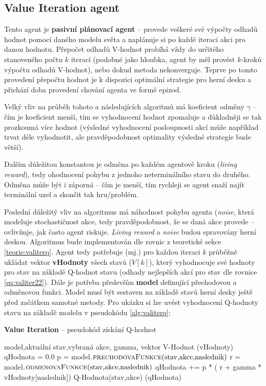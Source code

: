 \subsection*{Value Iteration agent}
\label{navrh:valiteragent}
Tento agent je \textbf{pasivní plánovací agent} -- provede veškeré své výpočty odhadů hodnot pomocí daného modelu světa a naplánuje si po každé iteraci akci pro danou hodnotu. Přepočet odhadů V-hodnot probíhá vždy do určitého stanoveného počtu $k$ iterací (podobné jako hloubka, agent by měl provést $k$-kroků výpočtu odhadů V-hodnot), nebo dokud metoda nekonverguje. Teprve po tomto provedení přepočtu hodnot je k dispozici optimální strategie pro herní desku a přichází doba provedení chování agenta ve formě epizod.

Velký vliv na průběh tohoto a následujících algoritmů má koeficient odměny $\gamma$ -- čím je koeficient menší, tím se vyhodnocení hodnot zpomaluje a důkladněji se tak prozkoumá více hodnot (výsledné vyhodnocení posloupnosti akcí může například trvat déle vyhodnotit, ale pravděpodobnost optimality výsledné strategie bude větší).

Dalším důležitou konstantou je odměna po každém agentově kroku (\textit{living reward}), tedy ohodnocení pohybu z jednoho neterminálního stavu do druhého. Odměna může být i záporná -- čím je menší, tím rychleji se agent snaží najít terminální uzel a skončit tak hru/problém. 

Poslední důležitý vliv na algoritmus má náhodnost pohybu agenta (\textit{noise}, která modeluje stochastičnost akce, tedy pravděpodobnost, že se daná akce provede -- ovlivňuje, jak často agent riskuje. \textit{Living reward} a \textit{noise} budou spravovány herní deskou.
\newline
Algoritmus bude implementován dle rovnic z teoretické sekce \ref{teorie:valiterq}. Agent tedy potřebuje (mj.) pro každou iteraci $k$ průběžně ukládat vektor \textbf{vHodnoty} všech stavů ($V\left[k\right]$), který vyhodnocuje své hodnoty pro stav na základě Q-hodnot stavu (odhady nejlepších akcí pro stav dle rovnice \ref{eq:valiter22}). Dále je potřeba především \textbf{model} definující přechodovou a odměnovou funkci. Model musí být sestaven na základě stavů herní desky ještě před začátkem samotné metody. Pro ukázku si lze uvést vyhodnocení Q-hodnoty stavu na základě modelu v pseudokódu \ref{alg:valiterq}:
 
\begin{algorithm}
\caption{\textbf{Value Iteration} -- pseudokód získání Q-hodnot}
\label{alg:valiterq}
\begin{algorithmic}[1]
\Require model,aktuální stav,vybraná akce, gamma, vektor V-Hodnot (vHodnoty)
\State qHodnota = 0.0
  \State p = model.$\text{\Call{prechodovaFunkce}{stav,akce,naslednik}}$
  \State r = model.$\text{\Call{odmenovaFunkce}{stav,akce,naslednik}}$
  \State qHodnota += p * ( r + gamma * vHodnoty[naslednik])
\EndFor
\Ensure Q-Hodnota(stav,akce) (qHodnota)
\end{algorithmic}
\end{algorithm}
\newpage

